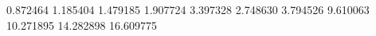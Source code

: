 0.872464
1.185404
1.479185
1.907724
3.397328
2.748630
3.794526
9.610063
10.271895
14.282898
16.609775
